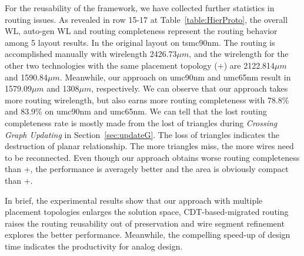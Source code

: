   
    For the reusability of the framework, we have collected further statistics in routing issues. As revealed in row 15-17 at Table~\ref{table:HierProto}, the overall WL, auto-gen WL and routing completeness represent the routing behavior among 5 layout results. In the original layout on tsmc90nm. The routing is accomplished manually with wirelength 2426.73$\mu m$, and the wirelength for the other two technologies with the same placement topology (\cite{msc-bhattacharya-tcad06}+\cite{Chin_DMR_ICCAD2013}) are 2122.814$\mu m$ and 1590.84$\mu m$. Meanwhile, our approach on umc90nm and umc65nm result in 1579.09$\mu m$ and 1308$\mu m$, respectively. We can observe that our approach takes more routing wirelength, but also earns more routing completeness with 78.8\% and 83.9\% on umc90nm and umc65nm. We can tell that the lost routing completeness rate is mostly made from the lost of triangles during {\it Crossing Graph Updating} in Section~\ref{sec:updateG}. The loss of triangles indicates the destruction of planar relationship. The more triangles miss, the more wires need to be reconnected. Even though our approach obtains worse routing completeness than \cite{msc-bhattacharya-tcad06}+\cite{Chin_DMR_ICCAD2013}, the performance is averagely better and the area is obviously compact than \cite{msc-bhattacharya-tcad06}+\cite{Chin_DMR_ICCAD2013}.

  In brief, the experimental results show that our approach with multiple placement topologies enlarges the solution space, CDT-based-migrated routing raises the routing reusability out of preservation and wire segment refinement explores the better performance. Meanwhile, the compelling speed-up of design time indicates the productivity for analog design.



